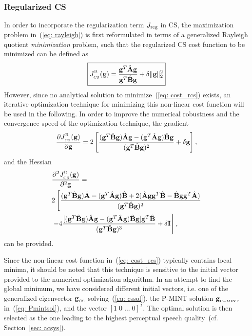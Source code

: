 \documentclass[10pt]{IEEEtran}
\begin{document}
\subsubsection*{Regularized CS}
In order to incorporate the regularization term $J_{\rm reg}$ in CS, the maximization problem in~(\ref{eq: rayleigh}) is first reformulated in terms of a generalized Rayleigh quotient \emph{minimization} problem, such that the regularized CS cost function to be minimized can be defined as
\begin{equation}
\label{eq: cost_rcs}
\boxed{J_{{}_{\rm CS}}^{^{_{\rm R}}}(\mathbf{g})= \frac{\mathbf{g}^T {\hat{\mathbf{A}}} \mathbf{g}}{\mathbf{g}^T {\hat{\mathbf{B}}} \mathbf{g}} + \delta \|\mathbf{g} \|_2^2}
\end{equation}
However, since no analytical solution to minimize~(\ref{eq: cost_rcs}) exists, an iterative optimization technique for minimizing this non-linear cost function will be used in the following.
In order to improve the numerical robustness and the convergence speed of the optimization technique, the gradient
\begin{equation}
\frac{\partial J_{{}_{\rm CS}}^{^{_{\rm R}}}(\mathbf{g})}{\partial \mathbf{g}} = 2 \left[ \frac{(\mathbf{g}^T \hat{\mathbf{B}} \mathbf{g})\hat{\mathbf{A}}\mathbf{g} - (\mathbf{g}^T \hat{\mathbf{A}} \mathbf{g})\hat{\mathbf{B}}\mathbf{g} }{(\mathbf{g}^T \hat{\mathbf{B}} \mathbf{g})^2} +  \delta \mathbf{g} \right],
\end{equation}
and the Hessian
\begin{equation}
\begin{split}
& \frac{\partial ^2 J_{{}_{\rm CS}}^{^{_{\rm R}}}(\mathbf{g})}{\partial^2 \mathbf{g}}  = \\
& 2 \left[ \frac{(\mathbf{g}^T \hat{\mathbf{B}} \mathbf{g}) \hat{\mathbf{A}} - (\mathbf{g}^T \hat{\mathbf{A}} \mathbf{g}) \hat{\mathbf{B}} + 2 ( \hat{\mathbf{A}} \mathbf{g} \mathbf{g}^T \hat{\mathbf{B}} - \hat{\mathbf{B}} \mathbf{g} \mathbf{g}^T \hat{\mathbf{A}})}{(\mathbf{g}^T \hat{\mathbf{B}}\mathbf{g})^2} \right. \\
& \left. -  4 \frac{[(\mathbf{g}^T\hat{\mathbf{B}}\mathbf{g})\hat{\mathbf{A}}\mathbf{g} - (\mathbf{g}^T\hat{\mathbf{A}}\mathbf{g})\hat{\mathbf{B}}\mathbf{g}] \mathbf{g}^T \hat{\mathbf{B}}}{(\mathbf{g}^T\hat{\mathbf{B}}\mathbf{g})^3} + \delta \mathbf{I} \right],
\end{split}
\end{equation}
can be provided.

Since the non-linear cost function in~(\ref{eq: cost_rcs}) typically contains local minima, it should be noted that this technique is sensitive to the initial vector provided to the numerical optimization algorithm.
In an attempt to find the global minimum, we have considered different initial vectors, i.e. one of the generalized eigenvector $\mathbf{g}_{_{\rm CS}}$ solving~(\ref{eq: cssol}), the P-MINT solution $\mathbf{g}_{{}_{\rm P-MINT}}$ in~(\ref{eq: Pmintsol}), and the vector $[1 \; 0 \; \ldots \; 0]^T$.
The optimal solution is then selected as the one leading to the highest perceptual speech quality~(cf. Section~\ref{sec: acsys}).
\end{document}
